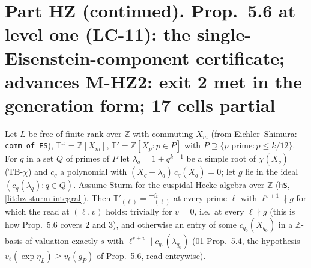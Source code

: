 \chapter{Part HZ (continued). Prop.~5.6 at level one (LC-11): the single-Eisenstein-component certificate; advances M-HZ2: exit 2 met in the generation form; 17 cells partial}

\begin{theorem}\label{inf:heckez-sturm}
  \leanok
  Let $L$ be free of finite rank over $\mathbb Z$ with commuting $X_m$ (from Eichler--Shimura: \texttt{comm\_of\_ES}),
  $\mathbb T^{\mathrm{fr}}=\mathbb Z[X_m]$, $\mathbb T'=\mathbb Z[X_p:p\in P]$ with $P\supseteq\{p\text{ prime}:p\le k/12\}$. For $q$ in a
  set $Q$ of primes of $P$ let $\lambda_q=1+q^{k-1}$ be a simple root of $\chi(X_q)$ (TB-$\chi$) and $c_q$ a polynomial with
  $(X_q-\lambda_q)\,c_q(X_q)=0$; let $g$ lie in the ideal $(c_q(\lambda_q):q\in Q)$. Assume Sturm for the cuspidal Hecke algebra over
  $\mathbb Z$ (\texttt{hS}, \ref{lit:hz-sturm-integral}). Then $\mathbb T'_{(\ell)}=\mathbb T^{\mathrm{fr}}_{(\ell)}$ at every prime
  $\ell$ with $\ell^{v+1}\nmid g$ for which the read at $(\ell,v)$ holds: trivially for $v=0$, i.e.\ at every $\ell\nmid g$ (this is how
  Prop.~5.6 covers $2$ and $3$), and otherwise an entry of some $c_{q_0}(X_{q_0})$ in a $\mathbb Z$-basis of valuation exactly $s$ with
  $\ell^{s+v}\mid c_{q_0}(\lambda_{q_0})$ (01 Prop.~5.4, the hypothesis $v_\ell(\exp\eta_L)\ge v_\ell(g_P)$ of Prop.~5.6, read entrywise).
\end{theorem}

